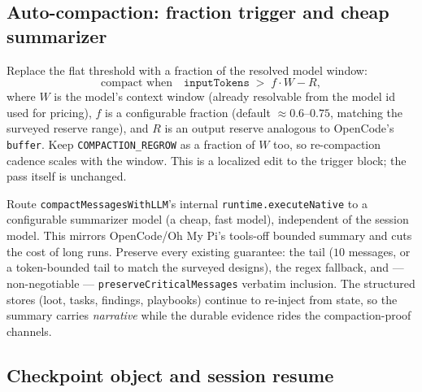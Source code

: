 \documentclass[11pt]{article}
\begin{document}
\subsection{Auto-compaction: fraction trigger and cheap summarizer}

Replace the flat threshold with a fraction of the resolved model window:
\[
\text{compact when}\quad
\texttt{inputTokens} \;>\; f \cdot W - R,
\]
where $W$ is the model's context window (already resolvable from the model id
used for pricing), $f$ is a configurable fraction (default $\approx 0.6$--$0.75$,
matching the surveyed reserve range), and $R$ is an output reserve analogous to
OpenCode's \texttt{buffer}. Keep \texttt{COMPACTION\_REGROW} as a fraction of
$W$ too, so re-compaction cadence scales with the window. This is a localized
edit to the trigger block; the pass itself is unchanged.

Route \texttt{compactMessagesWithLLM}'s internal
\texttt{runtime.executeNative} to a configurable summarizer model (a cheap,
fast model), independent of the session model. This mirrors OpenCode/Oh My Pi's
tools-off bounded summary and cuts the cost of long runs. Preserve every
existing guarantee: the tail ($10$ messages, or a token-bounded tail to match
the surveyed designs), the regex fallback, and --- non-negotiable ---
\texttt{preserveCriticalMessages} verbatim inclusion. The structured stores
(loot, tasks, findings, playbooks) continue to re-inject from state, so the
summary carries \emph{narrative} while the durable evidence rides the
compaction-proof channels.

\subsection{Checkpoint object and session resume}
\end{document}

